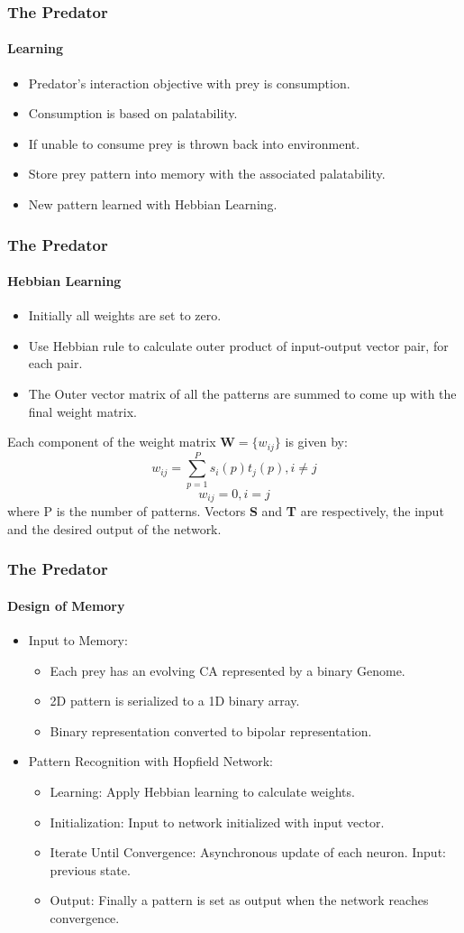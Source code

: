 \frame
{
	\frametitle{The Predator}
	\framesubtitle{Learning}

	\begin{itemize}
		\item Predator's interaction objective with prey is consumption.
		\item Consumption is based on palatability.
		\item If unable to consume prey is thrown back into environment.
		\item Store prey pattern into memory with the associated palatability.
		\item New pattern learned with Hebbian Learning.
	\end{itemize}
}

\frame
{
	\frametitle{The Predator}
	\framesubtitle{Hebbian Learning}

	\begin{itemize}
		\item Initially all weights are set to zero.
		\item Use Hebbian rule to calculate outer product of input-output vector pair, for each pair.
		\item The Outer vector matrix of all the patterns are summed to come up with the final weight matrix.
	\end{itemize}
	
Each component of the weight matrix \(\textbf{W} = \{w_{ij}\}\) is given by:
\begin{equation}
w_{ij} = \sum_{p=1}^{P} s_i(p) t_j(p), i \neq j
\end{equation}
\[
w_{ij} = 0, i = j
\]
where P is the number of patterns. Vectors \textbf{S} and \textbf{T} are respectively, the input and the desired output of the network.

}

\frame
{
	\frametitle{The Predator}
	\framesubtitle{Design of Memory}
	
	\begin{itemize}
		\item Input to Memory:
			\begin{itemize}
				\item Each prey has an evolving CA represented by a binary Genome.
				\item 2D pattern is serialized to a 1D binary array.
				\item Binary representation converted to bipolar representation.
			\end{itemize}
		\item Pattern Recognition with Hopfield Network:
			\begin{itemize}
				\item Learning: Apply Hebbian learning to calculate weights.
				\item Initialization: Input to network initialized with input vector.
				\item Iterate Until Convergence: Asynchronous update of each neuron. Input: previous state.
				\item Output: Finally a pattern is set as output when the network reaches convergence.
			\end{itemize}
	\end{itemize}
}


